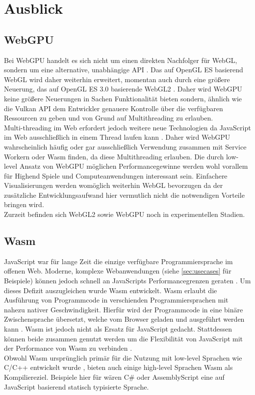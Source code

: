 \section{Ausblick}
\subsection{WebGPU}
Bei WebGPU handelt es sich nicht um einen direkten Nachfolger für WebGL, sondern um eine alternative, unabhängige API \cite{WebGPUIntro}. Das auf OpenGL ES basierend WebGL wird daher weiterhin erweitert, momentan auch durch eine größere Neuerung, das auf OpenGL ES 3.0 basierende WebGL2 \cite{WebGL2}. Daher wird WebGPU keine größere Neuerungen in Sachen Funktionalität bieten sondern, ähnlich wie die Vulkan API dem Entwickler genauere Kontrolle über die verfügbaren Ressourcen zu geben und von Grund auf Multithreading zu erlauben. \\
Multi-threading im Web erfordert jedoch weitere neue Technologien da JavaScript im Web ausschließlich in einem Thread laufen kann \cite{JSConcurrency}. Daher wird WebGPU wahrscheinlich häufig oder gar ausschließlich Verwendung zusammen mit Service Workern oder \ac{Wasm} finden, da diese Multithreading erlauben.
Die durch low-level Ansatz von WebGPU möglichen Performancegewinne werden wohl vorallem für Highend Spiele und Computeanwendungen interessant sein. Einfachere Visualisierungen werden womöglich weiterhin WebGL bevorzugen da der zusätzliche Entwicklungsaufwand hier vermutlich nicht die notwendigen Vorteile bringen wird. \\
Zurzeit befinden sich WebGL2 sowie WebGPU noch in experimentellen Stadien.
\subsection{\acf{Wasm}}
JavaScript war für lange Zeit die einzige verfügbare Programmiersprache im offenen Web. Moderne, komplexe Webanwendungen (siehe \ref{sec:usecases} für Beispiele) können jedoch schnell an JavaScripts Performancegrenzen geraten \cite{haas2017bringing}. Um dieses Defizit auszugleichen wurde \ac{Wasm} entwickelt. \ac{Wasm} erlaubt die Ausführung von Programmcode in verschienden Programmiersprachen mit nahezu nativer Geschwindigkeit. Hierfür wird der Programmcode in eine binäre Zwischensprache übersetzt, welche vom Browser geladen und ausgeführt werden kann \cite{WasmMDN}. \ac{Wasm} ist jedoch nicht als Ersatz für JavaScript gedacht. Stattdessen können beide zusammen genutzt werden um die Flexibilität von JavaScript mit der Performance von \ac{Wasm} zu verbinden \cite{WasmMDN}. \\
Obwohl \ac{Wasm} ursprünglich primär für die Nutzung mit low-level Sprachen wie C/C++ entwickelt wurde \cite{WasmMDN}, bieten auch einige high-level Sprachen \ac{Wasm} als Kompiliereziel. Beispiele hier für wären C\# \cite{dotnetWASM} oder AssemblyScript eine auf JavaScript basierend statisch typisierte Sprache\cite{AsmScript}.
